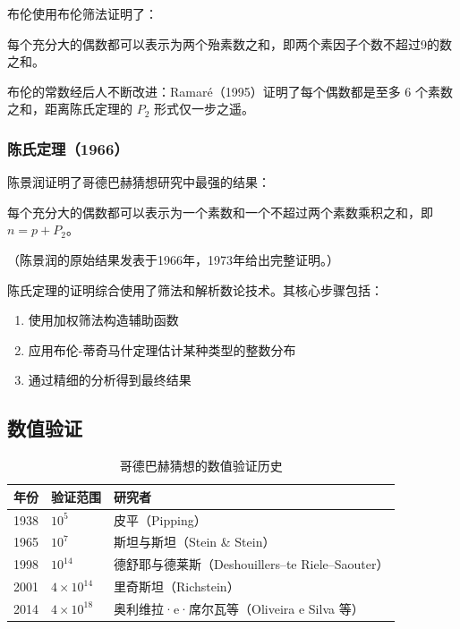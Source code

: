 布伦使用布伦筛法证明了\cite{brun1920sieve}：

\begin{theorem}[布伦定理]
    每个充分大的偶数都可以表示为两个殆素数之和，即两个素因子个数不超过9的数之和。
\end{theorem}

布伦的常数经后人不断改进：Ramaré（1995）证明了每个偶数都是至多 $6$ 个素数之和\cite{ramare1995explicit}，距离陈氏定理的 $P_2$ 形式仅一步之遥。

\subsubsection{陈氏定理（1966）}

陈景润证明了哥德巴赫猜想研究中最强的结果：

\begin{theorem}[陈氏定理]
    每个充分大的偶数都可以表示为一个素数和一个不超过两个素数乘积之和，即 $n = p + P_2$。
\end{theorem}

（陈景润的原始结果发表于1966年\cite{chen1966representation}，1973年给出完整证明。）

陈氏定理的证明综合使用了筛法和解析数论技术。其核心步骤包括：

\begin{enumerate}
    \item 使用加权筛法构造辅助函数
    \item 应用布伦-蒂奇马什定理估计某种类型的整数分布
    \item 通过精细的分析得到最终结果
\end{enumerate}

\subsection{数值验证}

\begin{table}[htbp]
    \centering
    \caption{哥德巴赫猜想的数值验证历史}
    \label{tab:verification}
    \begin{tabular}{@{}lll@{}}
        \toprule
        \textbf{年份} & \textbf{验证范围} & \textbf{研究者} \\
        \midrule
        1938 & $10^5$ & 皮平（Pipping） \\
        1965 & $10^7$ & 斯坦与斯坦（Stein \& Stein） \\
        1998 & $10^{14}$ & 德舒耶与德莱斯（Deshouillers--te Riele--Saouter） \\
        2001 & $4 \times 10^{14}$ & 里奇斯坦（Richstein） \\
        2014 & $4 \times 10^{18}$ & 奥利维拉·e·席尔瓦等（Oliveira e Silva 等） \\
        \bottomrule
    \end{tabular}
\end{table}

